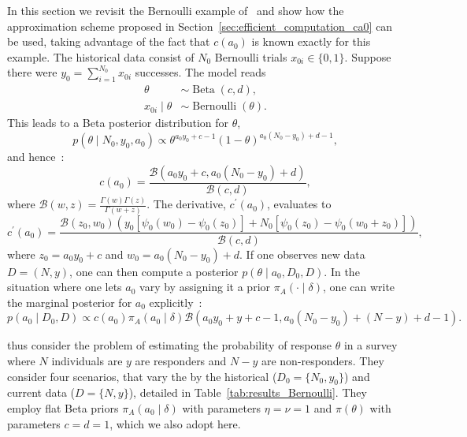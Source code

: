 \documentclass[a4paper, notitlepage, 11pt]{article}
\begin{document}
In this section we revisit the Bernoulli example of~\cite{Neuenschwander2009} and show how the approximation scheme proposed in Section~\ref{sec:efficient_computation_ca0} can be used, taking advantage of the fact that $c(a_0)$ is known exactly for this example.
The historical data consist of $N_0$ Bernoulli trials $x_{0i} \in \{0,1\}$.
Suppose there were $y_0 = \sum_{i=1}^{N_0}x_{0i}$ successes.
The model reads
\begin{align*}
 \theta &\sim \operatorname{Beta}(c, d), \\
 x_{0i} \mid \theta &\sim \operatorname{Bernoulli}(\theta).
\end{align*}
This leads to a Beta posterior distribution for $\theta$,
\begin{equation}
 \label{eq:bernoulli_posterior}
 p(\theta \mid N_0, y_0, a_0) \propto \theta ^{a_0 y_0 + c - 1} (1-\theta)^{a_0 (N_0 -y_0) + d - 1},
\end{equation}
and hence~\citep{Neuenschwander2009}:
\begin{equation}
 \label{eq:cA0_bernoulli}
 c(a_0) = \frac{\mathcal{B}(a_0 y_0 + c, a_0 (N_0 -y_0) + d)}{\mathcal{B}(c, d)},
\end{equation}
where $\mathcal{B}(w, z) = \frac{\Gamma(w)\Gamma(z)}{\Gamma(w + z)}$.
The derivative, $c^\prime(a_0)$, evaluates to
\begin{equation}
  \label{eq:cA0_prime_bernoulli}
c^\prime(a_0) = \frac{\mathcal{B}(z_0, w_0) \left(y_0 \left[\psi_0(w_0) - \psi_0(z_0) \right] + N_0 \left[ \psi_0(z_0) - \psi_0(w_0 + z_0) \right] \right) }{\mathcal{B}(c, d)},
\end{equation}
where $z_0 = a_0 y_0 + c $ and $w_0 = a_0 (N_0 -y_0) + d$.
If one observes new data $D = (N, y) $, one can then compute a posterior $p(\theta \mid a_0, D_0, D)$.
In the situation where one lets $a_0$ vary by assigning it a prior $\pi_A ( \cdot \mid \delta)$, one can write the marginal posterior for $a_0$ explicitly~\cite[Eq. 8]{Neuenschwander2009}:
\begin{equation}
 \label{eq:marginal_posterior_a0_Bernoulli}
 p(a_0 \mid D_0, D) \propto c(a_0) \pi_A(a_0 \mid \delta) \mathcal{B}(a_0 y_0 + y  + c -1, a_0(N_0-y_0) + (N -y) + d -1 ).
\end{equation}

\cite{Neuenschwander2009} thus consider the problem of estimating the probability of response $\theta$ in a survey where $N$ individuals are $y$ are responders and $N -y$ are non-responders.
They consider four scenarios, that vary the by the historical ($D_0 = \{N_0, y_0\}$) and current data ($D = \{N, y\}$), detailed in Table~\ref{tab:results_Bernoulli}.
They employ flat Beta priors $\pi_A(a_0\mid \delta)$ with parameters $\eta = \nu = 1$ and $\pi(\theta)$ with parameters $c = d = 1$, which we also adopt here.
\end{document}
